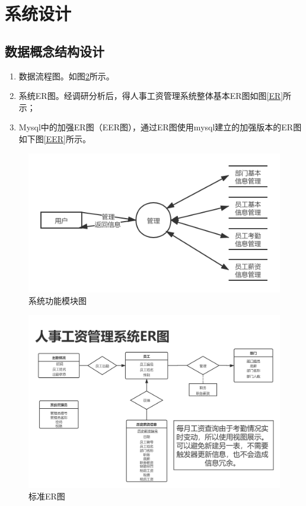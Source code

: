 \documentclass[withoutpreface,bwprint]{cumcmthesis} %
\begin{document}
\section{系统设计}
\subsection{数据概念结构设计}
\begin{enumerate}
	\item 数据流程图。如图\ref{shuju}所示。
	\item 系统ER图。经调研分析后，得人事工资管理系统整体基本ER图如图\ref{ER}所示；
	\item Mysql中的加强ER图（EER图），通过ER图使用mysql建立的加强版本的ER图如下图\ref{EER}所示。
\end{enumerate}
\begin{figure}[H]
    \centering
    \includegraphics[width=1\linewidth]{shuju}
    \caption{系统功能模块图}
    \label{shuju}
\end{figure}
\begin{figure}[H]
    \centering
    \includegraphics[width=1\linewidth]{SYSER}
    \caption{标准ER图}
    \label{shuju}
\end{figure}
\end{document}
